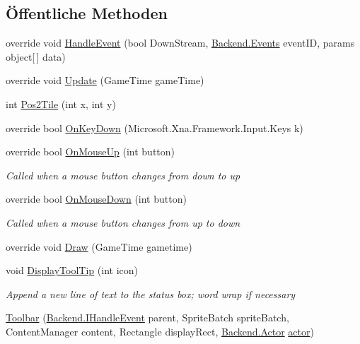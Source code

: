 \subsection*{Öffentliche Methoden}
\begin{DoxyCompactItemize}
\item 
override void \hyperlink{class_gruppe22_1_1_client_1_1_toolbar_a6f65c2804f64dd383e712ba2e8848a55}{Handle\-Event} (bool Down\-Stream, \hyperlink{namespace_gruppe22_1_1_backend_ab56df91bb0bdafa1ea978e552209ce73}{Backend.\-Events} event\-I\-D, params object\mbox{[}$\,$\mbox{]} data)
\item 
override void \hyperlink{class_gruppe22_1_1_client_1_1_toolbar_a6a41080cfa48a7d381703403590bc019}{Update} (Game\-Time game\-Time)
\item 
int \hyperlink{class_gruppe22_1_1_client_1_1_toolbar_af4846f1794ecf0d306911680a72a2f11}{Pos2\-Tile} (int x, int y)
\item 
override bool \hyperlink{class_gruppe22_1_1_client_1_1_toolbar_ad69a59be816d3f3db824004273253144}{On\-Key\-Down} (Microsoft.\-Xna.\-Framework.\-Input.\-Keys k)
\item 
override bool \hyperlink{class_gruppe22_1_1_client_1_1_toolbar_a0293be6c5ad20f3aebc4880dcca97c80}{On\-Mouse\-Up} (int button)
\begin{DoxyCompactList}\small\item\em Called when a mouse button changes from down to up \end{DoxyCompactList}\item 
override bool \hyperlink{class_gruppe22_1_1_client_1_1_toolbar_ab6cb1fab74198b858a77fc0d86220db5}{On\-Mouse\-Down} (int button)
\begin{DoxyCompactList}\small\item\em Called when a mouse button changes from up to down \end{DoxyCompactList}\item 
override void \hyperlink{class_gruppe22_1_1_client_1_1_toolbar_ab5535433852d69708692bd8df440f38d}{Draw} (Game\-Time gametime)
\item 
void \hyperlink{class_gruppe22_1_1_client_1_1_toolbar_a6ca289cafe5c0209c7f2a92a1bbf1371}{Display\-Tool\-Tip} (int icon)
\begin{DoxyCompactList}\small\item\em Append a new line of text to the status box; word wrap if necessary \end{DoxyCompactList}\item 
\hyperlink{class_gruppe22_1_1_client_1_1_toolbar_aa3f09a77f5eca812f59f4fda4c93b574}{Toolbar} (\hyperlink{interface_gruppe22_1_1_backend_1_1_i_handle_event}{Backend.\-I\-Handle\-Event} parent, Sprite\-Batch sprite\-Batch, Content\-Manager content, Rectangle display\-Rect, \hyperlink{class_gruppe22_1_1_backend_1_1_actor}{Backend.\-Actor} \hyperlink{class_gruppe22_1_1_client_1_1_toolbar_a5a2570864b162027148e4b96159b938a}{actor})
\end{DoxyCompactItemize}
